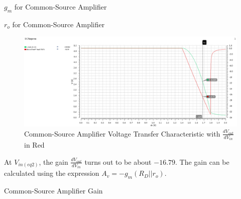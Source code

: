 \FloatBarrier

\begin{table}[h!]
	\centering
	\caption{$g_{m}$ for Common-Source Amplifier}
	\label{tab:common_source_amp_gm}
\end{table}

\FloatBarrier

\FloatBarrier

\begin{table}[h!]
	\centering
	\caption{$r_{o}$ for Common-Source Amplifier}
	\label{tab:common_source_amp_ro}
\end{table}

\FloatBarrier


\FloatBarrier

\begin{figure}[h!]
	\centering
	\includegraphics[scale=0.45]{./images/sim2_vtc_deriv.PNG}
	\caption{Common-Source Amplifier Voltage Transfer Characteristic with $\frac{dV_{out}}{dV_{in}}$ in Red}
	\label{fig:sim2_vtc_deriv}
\end{figure}

\FloatBarrier

At $V_{in(eq2)}$, the gain $\frac{dV_{out}}{dV_{in}}$ turns out to be about $-16.79$.
The gain can be calculated using the expression $A_{v} = -g_{m}(R_{D} || r_{o})$.

\FloatBarrier

\begin{table}[h!]
	\centering
	\caption{Common-Source Amplifier Gain}
	\label{tab:common_source_amp_gain}
\end{table}

\FloatBarrier



